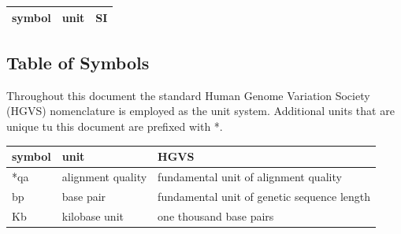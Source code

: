 \documentclass[12pt]{article}
\begin{document}
\renewcommand{\arraystretch}{1.2}
\begin{center}
  \begin{tabular}{l l l} 
    \toprule		
    \textbf{symbol} & \textbf{unit} & \textbf{SI}\\
    \midrule 
    
    \bottomrule
  \end{tabular}
\end{center}





\subsection{Table of Symbols}

Throughout this document the standard Human Genome Variation Society (HGVS) nomenclature is employed as the unit system.
Additional units that are unique tu this document are prefixed with *.

\begin{center}
  \begin{tabular}{l l l} 
    \toprule		
    \textbf{symbol} & \textbf{unit} & \textbf{HGVS}\\
    \midrule 
    *qa & alignment quality & fundamental unit of alignment quality
    \\
    bp & base pair & fundamental unit of genetic sequence length
    \\
    Kb & kilobase unit & one thousand base pairs
    \\
    \bottomrule
  \end{tabular}
  \end{center}
\end{document}
